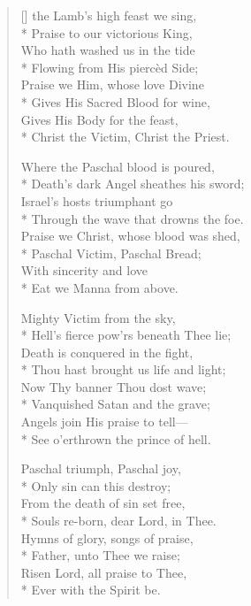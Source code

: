 \newHymn

\begin{verse}[\versewidth]
 the Lamb's high feast we sing,\\*
Praise to our victorious King,\\
Who hath washed us in the tide\\*
Flowing from His piercèd Side;\\\pointorig
Praise we Him, whose love Divine\\*
Gives His Sacred Blood for wine,\\
Gives His Body for the feast,\\*
Christ the Victim, Christ the Priest.

Where the Paschal blood is poured,\\*
Death's dark Angel sheathes his sword;\\
Israel's hosts triumphant go\\*
Through the wave that drowns the foe.\\
Praise we Christ, whose blood was shed,\\*
Paschal Victim, Paschal Bread;\\
With sincerity and love\\*
Eat we Manna from above.

Mighty Victim from the sky,\\*
Hell's fierce pow'rs beneath Thee lie;\\
Death is conquered in the fight,\\*
Thou hast brought us life and light;\\
Now Thy banner Thou dost wave;\\*
Vanquished Satan and the grave;\\
Angels join His praise to tell---\\*
See o'erthrown the prince of hell.

Paschal triumph, Paschal joy,\\*
Only sin can this destroy;\\
From the death of sin set free,\\*
Souls re-born, dear Lord, in Thee.\\
Hymns of glory, songs of praise,\\*
Father, unto Thee we raise;\\
Risen Lord, all praise to Thee,\\*
Ever with the Spirit be.

\end{verse}

